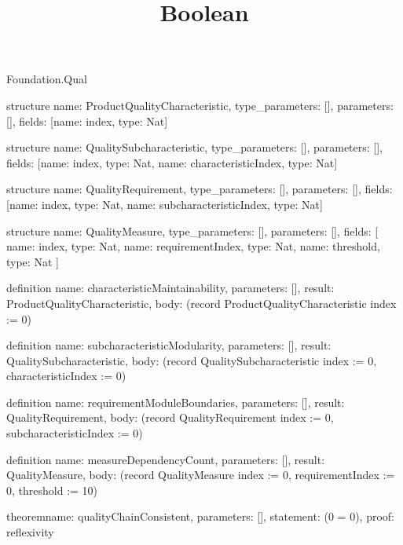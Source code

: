 \begin{lexlean}{Foundation.Qual}
\title{Boolean}
\begin{semanticmodule}
structure{
  name: ProductQualityCharacteristic,
  type_parameters: [],
  parameters: [],
  fields: [{name: index, type: Nat}]
}

structure{
  name: QualitySubcharacteristic,
  type_parameters: [],
  parameters: [],
  fields: [{name: index, type: Nat}, {name: characteristicIndex, type: Nat}]
}

structure{
  name: QualityRequirement,
  type_parameters: [],
  parameters: [],
  fields: [{name: index, type: Nat}, {name: subcharacteristicIndex, type: Nat}]
}

structure{
  name: QualityMeasure,
  type_parameters: [],
  parameters: [],
  fields: [
    {name: index, type: Nat},
    {name: requirementIndex, type: Nat},
    {name: threshold, type: Nat}
  ]
}

definition{
  name: characteristicMaintainability,
  parameters: [],
  result: ProductQualityCharacteristic,
  body: (record ProductQualityCharacteristic {index := 0})
}

definition{
  name: subcharacteristicModularity,
  parameters: [],
  result: QualitySubcharacteristic,
  body: (record QualitySubcharacteristic {index := 0, characteristicIndex := 0})
}

definition{
  name: requirementModuleBoundaries,
  parameters: [],
  result: QualityRequirement,
  body: (record QualityRequirement {index := 0, subcharacteristicIndex := 0})
}

definition{
  name: measureDependencyCount,
  parameters: [],
  result: QualityMeasure,
  body: (record QualityMeasure {index := 0, requirementIndex := 0, threshold := 10})
}

theorem{name: qualityChainConsistent, parameters: [], statement: (0 = 0), proof: reflexivity{}}
\end{semanticmodule}
\end{lexlean}
